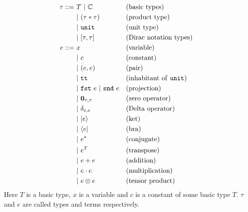 \begin{definition}[syntax]
  \begin{align*}
    \tau ::= \ 
      & T\ |\ \mathbb{C}                && \text{(basic types)} \\
      & |\ (\tau * \tau)                && \text{(product type)} \\
      & |\ \unit                          && \text{(unit type)} \\
      & |\ [\tau, \tau]                   && \text{(Dirac notation types)} \\ 
    e ::= \ 
      &    x                          && \text{(variable)} \\
      & |\ c                          && \text{(constant)} \\
      & |\ (e, e)                     && \text{(pair)} \\
      & |\ \utt                       && \text{(inhabitant of \unit)} \\
      & |\ \fst\ e\ |\ \snd\ e        && \text{(projection)} \\
      & |\ \mathbf{0}_{\tau, \tau}    && \text{(zero operator)}\\
      & |\ \delta_{e, e}              && \text{(Delta operator)} \\
      & |\ \ket{e}                    && \text{(ket)} \\
      & |\ \bra{e}                    && \text{(bra)} \\
      & |\ e^*                        && \text{(conjugate)} \\
      & |\ e^T                        && \text{(transpose)} \\
      & |\ e + e                      && \text{(addition)} \\
      & |\ e \cdot e                  && \text{(multiplication)} \\
      & |\ e \otimes e                && \text{(tensor product)}
    \end{align*}
  Here $T$ is a basic type, $x$ is a variable and $c$ is a constant of some basic type $T$. $\tau$ and $e$ are called types and terms respectively.
\end{definition}

